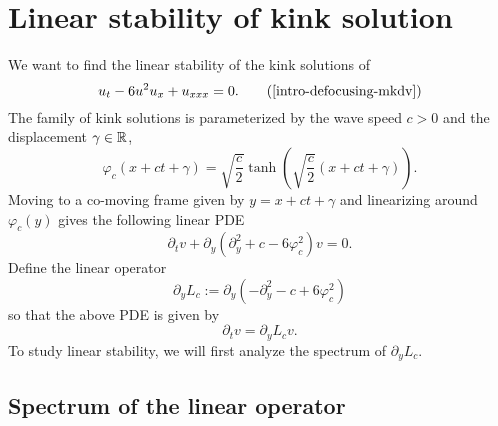 \section{Linear stability of kink solution}


We want to find the linear stability of the kink solutions of 
\begin{equation*}
	u_t - 6u^2u_x + u_{xxx} = 0. \tag{\ref{intro-defocusing-mkdv}}
\end{equation*}
The family of kink solutions is parameterized by the wave speed \(c>0\) and the displacement \(\gamma \in \mathbb{R}\),
\begin{equation}
	\varphi_c(x + ct + \gamma)  = \sqrt{\frac c 2} \tanh\left(\sqrt{\frac c 2} (x +ct + \gamma) \right).
\end{equation}
Moving to a co-moving frame given by \(y = x+ct+\gamma\) and linearizing around \(\varphi_c(y)\) gives the following linear PDE
\begin{equation}
	\partial_t v + \partial_y (\partial_y^2 + c - 6 \varphi_c^2)v = 0.
\end{equation}
Define the linear operator
\begin{equation}
	\partial_y L_c := \partial_y(-\partial_y^2 - c + 6 \varphi_c^2)
\end{equation}
so that the above PDE is given by 
\begin{equation}\label{linear-v-eqn}
	\partial_t v = \partial_y L_c v.
\end{equation}
To study linear stability, we will first analyze the spectrum of \(\partial_y L_c\).

\subsection{Spectrum of the linear operator}

